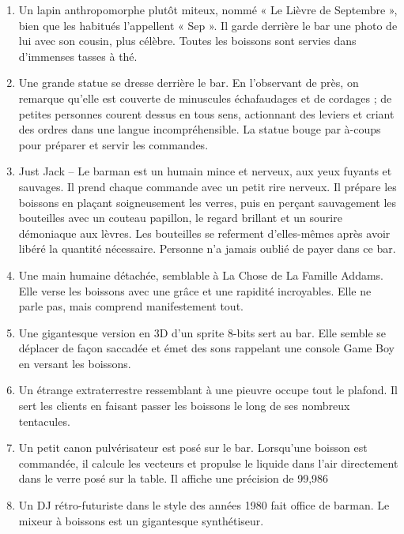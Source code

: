 \documentclass{article}
\begin{document}
\begin{enumerate}
	\item Un lapin anthropomorphe plutôt miteux, nommé « Le Lièvre de Septembre », bien que les habitués l’appellent « Sep ». Il garde derrière le bar une photo de lui avec son cousin, plus célèbre. Toutes les boissons sont servies dans d’immenses tasses à thé.
	\item Une grande statue se dresse derrière le bar. En l’observant de près, on remarque qu’elle est couverte de minuscules échafaudages et de cordages ; de petites personnes courent dessus en tous sens, actionnant des leviers et criant des ordres dans une langue incompréhensible. La statue bouge par à-coups pour préparer et servir les commandes.
	\item Just Jack – Le barman est un humain mince et nerveux, aux yeux fuyants et sauvages. Il prend chaque commande avec un petit rire nerveux. Il prépare les boissons en plaçant soigneusement les verres, puis en perçant sauvagement les bouteilles avec un couteau papillon, le regard brillant et un sourire démoniaque aux lèvres. Les bouteilles se referment d’elles-mêmes après avoir libéré la quantité nécessaire. Personne n’a jamais oublié de payer dans ce bar.
	\item Une main humaine détachée, semblable à La Chose de La Famille Addams. Elle verse les boissons avec une grâce et une rapidité incroyables. Elle ne parle pas, mais comprend manifestement tout.
	\item Une gigantesque version en 3D d’un sprite 8-bits sert au bar. Elle semble se déplacer de façon saccadée et émet des sons rappelant une console Game Boy en versant les boissons.
	\item Un étrange extraterrestre ressemblant à une pieuvre occupe tout le plafond. Il sert les clients en faisant passer les boissons le long de ses nombreux tentacules.
	\item Un petit canon pulvérisateur est posé sur le bar. Lorsqu’une boisson est commandée, il calcule les vecteurs et propulse le liquide dans l’air directement dans le verre posé sur la table. Il affiche une précision de 99,986 %
	\item Un DJ rétro-futuriste dans le style des années 1980 fait office de barman. Le mixeur à boissons est un gigantesque synthétiseur.


\end{enumerate}
\end{document}
